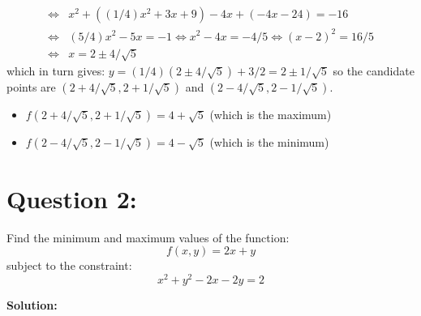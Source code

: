 \documentclass{article}
\newcommand{\dr}[1]{\textcolor{dark_red}{#1}}
\begin{document}
{\begin{align*}
\iff & x^2 + ((1/4)x^2 + 3x + 9) - 4x + (-4x - 24) = -16 \\
\iff & (5/4)x^2 - 5x = -1 
\iff x^2 - 4x = -4/5 
\iff (x - 2)^2 = 16/5 \\
\iff & x = 2 \pm 4/\sqrt{5}
\end{align*}
which in turn gives: \(y = (1/4)(2 \pm 4/\sqrt{5}) + 3/2 = 2 \pm 1/\sqrt{5}\) so the candidate points are \((2 + 4/\sqrt{5}, 2 + 1/\sqrt{5})\) and \((2 - 4/\sqrt{5}, 2 - 1/\sqrt{5})\). 
\begin{itemize}
\item \(f(2 + 4/\sqrt{5}, 2 + 1/\sqrt{5}) = 4 + \sqrt{5}\) (which is the maximum)
\item \(f(2 - 4/\sqrt{5}, 2 - 1/\sqrt{5}) = 4 - \sqrt{5}\) (which is the minimum)
\end{itemize}
}




\section*{Question 2:}

Find the minimum and maximum values of the function:
\[f(x,y) = 2x + y\]
subject to the constraint:
\[x^2 + y^2 - 2x - 2y = 2\]

\vspace{5mm}
\dr{\textbf{Solution:}}
\end{document}
